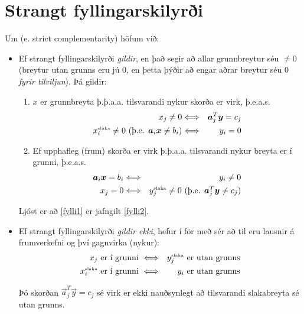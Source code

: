 \section{Strangt fyllingarskilyrði}
Um  (e. strict complement\-arity) höfum við: 
\begin{itemize} 
\item Ef strangt fyllingarskilyrði \emph{gildir}, en það segir að allar grunnbreytur séu $\ne 0$ (breytur utan grunns eru jú $0$, en þetta þýðir að engar aðrar breytur séu $0$ \emph{fyrir tilviljun}). Þá gildir: 
  \begin{enumerate}[label=(\roman{*})]
  \item\label{fylli1} $x$ er grunnbreyta þ.þ.a.a. tilsvarandi nykur skorða er virk, þ.e.a.s.
  \begin{eqnarray*}
      x_j\ne 0 & \Longleftrightarrow &\vec{a}_j^T\vec{y} = c_j \\
      x_i^{\mbox{\tiny slaka}} \ne 0 \mbox{  (þ.e. $\vec{a}_i\vec{x}\ne b_i$)} & \Longleftrightarrow & y_i = 0 
   \end{eqnarray*}
   \item\label{fylli2} Ef upphafleg (frum) skorða er virk þ.þ.a.a. tilsvarandi nykur \mbox{breyta} er í grunni, þ.e.a.s. 
  \begin{eqnarray*}
  \vec{a}_i\vec{x} = b_i &\Longleftrightarrow & y_i \ne 0 \\
  x_j = 0  & \Longleftrightarrow & y_j^{\mbox{\tiny slaka}} \ne 0 \mbox{  (þ.e. $\vec{a}_j^T\vec{y}\ne   c_j$)}
  \end{eqnarray*}
  \end{enumerate}
  \begin{aths}Ljóst er að \ref{fylli1} er jafngilt \ref{fylli2}.\end{aths}
  \item Ef strangt fyllingarskilyrði \emph{gildir ekki}, hefur í för með sér að til eru lausnir á frumverkefni og því gagnvirka (nykur):
  \begin{eqnarray*}
  x_j \textrm{ er í grunni } & \Longleftrightarrow & y_j^{\textrm{\textrm{\tiny slaka}}} \textrm{ er utan grunns} \\
  x_i^{\mbox{\tiny slaka}}\textrm{ er í grunni } &\Longleftrightarrow& y_i \textrm{ er utan grunns}  
  \end{eqnarray*}
\begin{aths}Þó skorðan $\vec{a}_j^T\vec{y} = c_j$ sé virk er ekki nauðsynlegt að tilsvarandi slakabreyta sé utan grunns.\end{aths}
\end{itemize}

